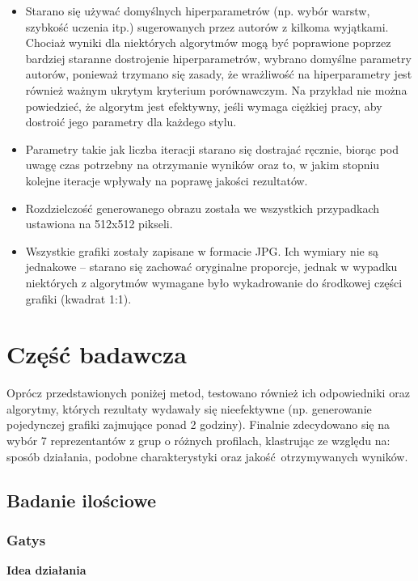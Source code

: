 \documentclass[12pt]{article}
\begin{document}
\begin{itemize}
    \item Starano się używać domyślnych hiperparametrów (np. wybór warstw, szybkość uczenia itp.) sugerowanych przez autorów z kilkoma wyjątkami. Chociaż wyniki dla niektórych algorytmów mogą być poprawione poprzez bardziej staranne dostrojenie hiperparametrów, wybrano domyślne parametry autorów, ponieważ trzymano się zasady, że wrażliwość na hiperparametry jest również ważnym ukrytym kryterium porównawczym. Na przykład nie można powiedzieć, że algorytm jest efektywny, jeśli wymaga ciężkiej pracy, aby dostroić jego parametry dla każdego stylu.
    \item Parametry takie jak liczba iteracji starano się dostrajać ręcznie, biorąc pod uwagę czas potrzebny na otrzymanie wyników oraz to, w jakim stopniu kolejne iteracje wpływały na poprawę jakości rezultatów.
    \item Rozdzielczość generowanego obrazu została we wszystkich przypadkach ustawiona na 512x512 pikseli.
    \item Wszystkie grafiki zostały zapisane w formacie JPG. Ich wymiary nie są jednakowe – starano się zachować oryginalne proporcje, jednak w wypadku niektórych z algorytmów wymagane było wykadrowanie do środkowej części grafiki (kwadrat 1:1).
\end{itemize}
\newpage

\section{Część badawcza}

\indent

Oprócz przedstawionych poniżej metod, testowano również ich odpowiedniki oraz algorytmy, których rezultaty wydawały się nieefektywne (np. generowanie pojedynczej grafiki zajmujące ponad 2 godziny). Finalnie zdecydowano się na wybór 7 reprezentantów z grup o różnych profilach, klastrując ze względu na: sposób działania, podobne charakterystyki oraz jakość otrzymywanych wyników.

\subsection{Badanie ilościowe}

\subsubsection{Gatys}

\noindent\textbf{Idea działania}
\end{document}
